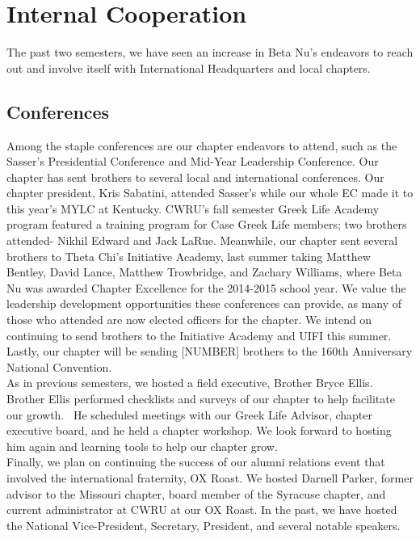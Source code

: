 \chapter{Internal Cooperation}
  The past two semesters, we have seen an increase in Beta Nu’s endeavors to reach out and involve itself with International Headquarters and local chapters. 
  
  \section*{Conferences}
  
    Among the staple conferences are our chapter endeavors to attend, such as the Sasser's Presidential Conference and Mid-Year Leadership Conference. Our chapter has sent brothers to several local and international conferences. Our chapter president, Kris Sabatini, attended Sasser's while our whole EC made it to this year's MYLC at Kentucky. CWRU's fall semester Greek Life Academy program featured a training program for Case Greek Life members; two brothers attended- Nikhil Edward and Jack LaRue. Meanwhile, our chapter sent several brothers to Theta Chi's Initiative Academy, last summer taking Matthew Bentley, David Lance, Matthew Trowbridge, and Zachary Williams, where Beta Nu was awarded Chapter Excellence for the 2014-2015 school year. We value the leadership development opportunities these conferences can provide, as many of those who attended are now elected officers for the chapter. We intend on continuing to send brothers to the Initiative Academy and UIFI this summer. Lastly, our chapter will be sending [NUMBER] brothers to the 160th Anniversary National Convention. \\
    
       
    As in previous semesters, we hosted a field executive, Brother Bryce Ellis. Brother Ellis performed checklists and surveys of our chapter to help facilitate our growth.  He scheduled meetings with our Greek Life Advisor, chapter executive board, and he held a chapter workshop. We look forward to hosting him again and learning tools to help our chapter grow. \\
    
    Finally, we plan on continuing the success of our alumni relations event that involved the international fraternity, OX Roast. We hosted Darnell Parker, former advisor to the Missouri chapter, board member of the Syracuse chapter, and current administrator at CWRU at our OX Roast. In the past, we have hosted the National Vice-President, Secretary, President, and several notable speakers. 
    
